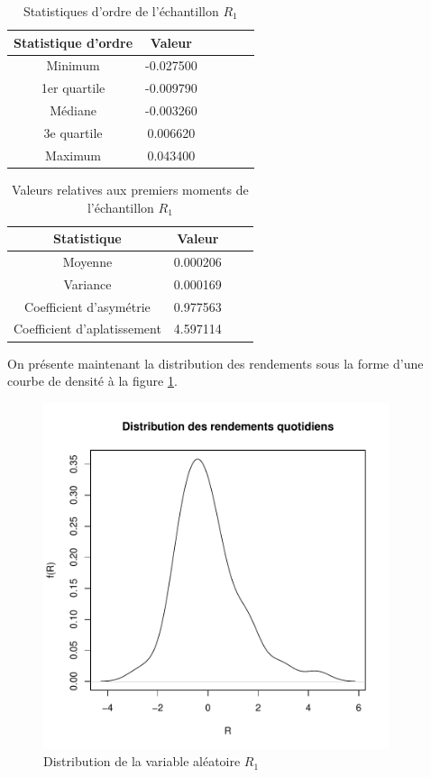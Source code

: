 \begin{table}[!ht]
  \centering
  \begin{tabular}{cccccc}
    \hline
    \textbf{Statistique d'ordre} & \textbf{Valeur} \\
    \hline
    Minimum & -0.027500\\ 
    1er quartile & -0.009790\\ 
    Médiane & -0.003260\\ 
    3e quartile & 0.006620\\ 
    Maximum & 0.043400\\ 
    \hline
    
  \end{tabular}
  \caption{Statistiques d'ordre de l'échantillon $R_1$}
  \label{tab:statordreR1}
\end{table}

\begin{table}[!ht]
  \centering
  \begin{tabular}{cccc}
    \hline
    \textbf{Statistique} & \textbf{Valeur} \\
    \hline
    Moyenne & 0.000206\\ 
    Variance & 0.000169\\ 
    Coefficient d'asymétrie & 0.977563\\ 
    Coefficient d'aplatissement & 4.597114 \\ 
    \hline
  \end{tabular}
  \caption{Valeurs relatives aux premiers moments de l'échantillon $R_1$}
  \label{tab:statmomentsR1}
\end{table}

On présente maintenant la distribution des rendements sous la forme
d'une courbe de densité à la figure \ref{fig:distributionR1}.

\begin{figure}[!ht]
  \centering
  \includegraphics[height=4in,width=4in]{../graphiques/ABBEYN-histogramme.pdf}
  \caption{Distribution de la variable aléatoire $R_1$}
  \label{fig:distributionR1}
\end{figure}

